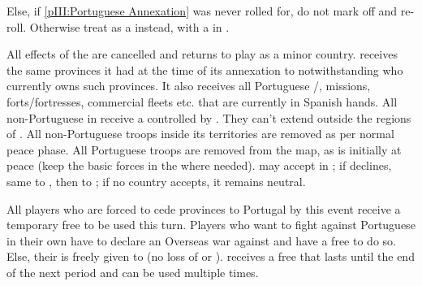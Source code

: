 

\aparag Else, if \ref{pIII:Portuguese Annexation} was never rolled for, do not
mark off and re-roll.
\aparag Otherwise treat as a \RD instead, with a \REVOLT in \SPA.

\phevnt
\aparag All effects of the  are
cancelled and \paysPortugal returns to play as a minor country.  \paysPortugal
receives the same provinces it had at the time of its annexation to \SPA
notwithstanding who currently owns such provinces. It also receives all
Portuguese \COL/\TP, missions, forts/fortresses, commercial fleets etc. that
are currently in Spanish hands.
\aparag All non-Portuguese \COL in  receive a \REVOLT
\faceplus controlled by \paysPortugal. They can't extend outside the regions
of .
\aparag All non-Portuguese troops inside its territories are removed as per
normal peace phase.
\aparag All Portuguese troops are removed from the map, as \paysPortugal is
initially at peace (keep the basic forces in the \ROTW where needed).
\aparag \ENG may accept \paysportugal in \EG; if \ENG declines, same to \FRA,
then to \SUE; if no country accepts, it remains neutral.

\phdipl
\aparag All players who are forced to cede provinces to Portugal by this event
receive a temporary free \CB to be used this turn.
\aparag Players who want to fight against Portuguese \REVOLT in their own \COL
have to declare an Overseas war against \paysPortugal and have a free \CB to
do so.  Else, their \COL is freely given to \paysportugal (no loss of \STAB or
\VPs).
\aparag \SPA receives a free \CB that lasts until the end of the next period
and can be used multiple times.

